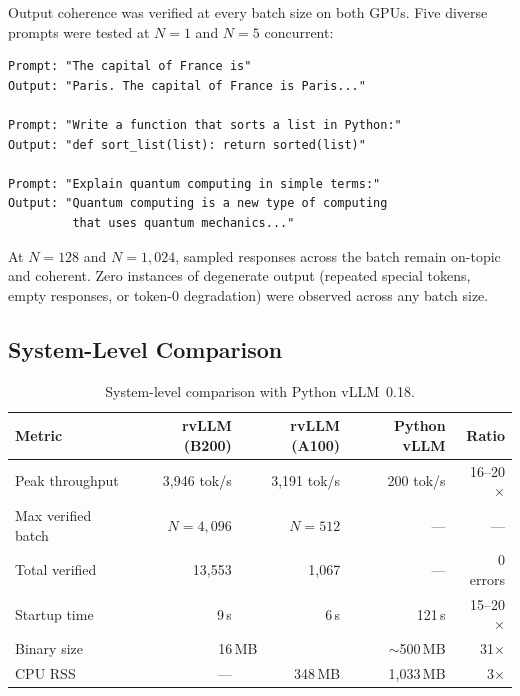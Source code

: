 \documentclass[11pt,a4paper]{article}
\newcommand{\thead}[1]{\textbf{#1}}
\begin{document}
Output coherence was verified at every batch size on both GPUs. Five diverse
prompts were tested at $N\!=\!1$ and $N\!=\!5$ concurrent:

\begin{lstlisting}[language={},numbers=none,frame=none,xleftmargin=0em]
Prompt: "The capital of France is"
Output: "Paris. The capital of France is Paris..."

Prompt: "Write a function that sorts a list in Python:"
Output: "def sort_list(list): return sorted(list)"

Prompt: "Explain quantum computing in simple terms:"
Output: "Quantum computing is a new type of computing
         that uses quantum mechanics..."
\end{lstlisting}

At $N\!=\!128$ and $N\!=\!1{,}024$, sampled responses across the batch remain
on-topic and coherent. Zero instances of degenerate output (repeated special tokens,
empty responses, or token-0 degradation) were observed across any batch size.

\subsection{System-Level Comparison}

\begin{table}[t]
  \centering
  \caption{System-level comparison with Python vLLM~0.18.}
  \label{tab:system}
  \small
  \begin{tabular}{@{}lrrrr@{}}
    \toprule
    \rowcolor{HeaderBlue} \thead{Metric} & \thead{rvLLM (B200)} & \thead{rvLLM (A100)} & \thead{Python vLLM} & \thead{Ratio} \\
    \midrule
    Peak throughput    & 3{,}946 tok/s & 3{,}191 tok/s & 200 tok/s & 16--20$\times$ \\
    \rowcolor{gray!8}
    Max verified batch & $N\!=\!4{,}096$ & $N\!=\!512$ & --- & --- \\
    Total verified     & 13{,}553 & 1{,}067 & --- & 0 errors \\
    \rowcolor{gray!8}
    Startup time       & 9\,s    & 6\,s    & 121\,s  & 15--20$\times$ \\
    Binary size        & \multicolumn{2}{c}{16\,MB} & $\sim$500\,MB & 31$\times$ \\
    \rowcolor{gray!8}
    CPU RSS            & ---     & 348\,MB & 1{,}033\,MB & 3$\times$ \\
    \bottomrule
  \end{tabular}
\end{table}
\end{document}
